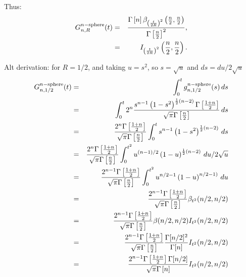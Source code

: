 Thus:
\begin{eqnarray}
G^{n-{\rm sphere}}_{n,R}(t)
    & = &\frac{\Gamma \left[n \right] {\beta}_{{\left(\frac{t}{2 R}\right)}^{2}}\left( \frac{n}{2},\frac{n}{2}\right)}
     {\Gamma\left[\frac{n}{2}\right]^{2}},  \nonumber \\   
     & = &  {I}_{{\left(\frac{t}{2 R}\right)}^{2}}\left( \frac{n}{2},\frac{n}{2}\right).
\end{eqnarray}




Alt derivation: for $R=1/2$, and taking $u=s^2$, so $s = \sqrt{u}$ and
$ds = du/2\sqrt{u}$
\begin{eqnarray}
G^{n-{\rm sphere}}_{n,1/2}(t)
    & = & \int_0^t g^{n-{\rm sphere}}_{n,1/2}(s) \, ds \nonumber \\
    & = & \int_0^t  2^n \frac{s^{n-1}
             \left(1 -s^2\right)^{\frac{1}{2} (n-2)}
             \Gamma\left[\frac{1+n}{2}\right]}{\sqrt{\pi }
             \Gamma\left[\frac{n}{2}\right]} 
             \, ds \nonumber \\    
    & = & \frac{ 2^n \Gamma\left[\frac{1+n}{2}\right]}{\sqrt{\pi}\Gamma\left[\frac{n}{2}\right]}
           \int_0^t s^{n-1}  \left(1 -s^2\right)^{\frac{1}{2} (n-2)}
             \, ds \nonumber \\    
    & = & \frac{ 2^n \Gamma\left[\frac{1+n}{2}\right]}{\sqrt{\pi}\Gamma\left[\frac{n}{2}\right]}
           \int_0^{t^2} u^{(n-1)/2}  \left(1 - u\right)^{\frac{1}{2} (n-2)}
             \, du/2\sqrt{u}  \nonumber \\    
    & = & \frac{ 2^{n-1} \Gamma\left[\frac{1+n}{2}\right]}{\sqrt{\pi}\Gamma\left[\frac{n}{2}\right]}
           \int_0^{t^2} u^{n/2-1}  \left(1 - u\right)^{n/2-1)}
             \, du  \nonumber \\    
    & = & \frac{ 2^{n-1} \Gamma\left[\frac{1+n}{2}\right]}{\sqrt{\pi}\Gamma\left[\frac{n}{2}\right]}
               \beta_{t^2}(n/2, n/2)  \nonumber \\    
    & = & \frac{ 2^{n-1} \Gamma\left[\frac{1+n}{2}\right]}{\sqrt{\pi}\Gamma\left[\frac{n}{2}\right]}
              \beta(n/2,n/2) I_{t^2}(n/2, n/2)  \nonumber \\    
    & = & \frac{ 2^{n-1} \Gamma\left[\frac{1+n}{2}\right]}{\sqrt{\pi}\Gamma\left[\frac{n}{2}\right]}
              \frac{\Gamma[n/2]^2}{\Gamma[n]} I_{t^2}(n/2, n/2)  \nonumber \\    
    & = & \frac{ 2^{n-1} \Gamma\left[\frac{1+n}{2}\right]\Gamma[n/2] }{\sqrt{\pi}\Gamma\left[n\right]}
              I_{t^2}(n/2, n/2)  \nonumber \\    
\end{eqnarray}




